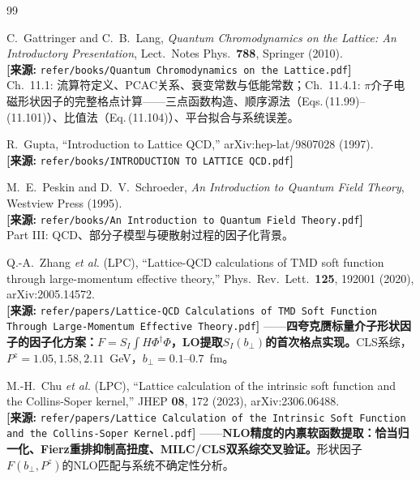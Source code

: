 \documentclass[12pt,a4paper]{ctexart}
\theoremstyle{definition}
\begin{document}
\begin{thebibliography}{99}

C.~Gattringer and C.~B.~Lang,
\textit{Quantum Chromodynamics on the Lattice: An Introductory Presentation},
Lect.\ Notes Phys.\ \textbf{788}, Springer (2010).
\\\textbf{[来源:} \texttt{refer/books/Quantum Chromodynamics on the Lattice.pdf}\textbf{]}
\\Ch.~11.1: 流算符定义、PCAC关系、衰变常数与低能常数；Ch.~11.4.1: $\pi$介子电磁形状因子的完整格点计算——三点函数构造、顺序源法（Eqs.\,(11.99)--(11.101)）、比值法（Eq.\,(11.104)）、平台拟合与系统误差。

R.~Gupta,
``Introduction to Lattice QCD,''
arXiv:hep-lat/9807028 (1997).
\\\textbf{[来源:} \texttt{refer/books/INTRODUCTION TO LATTICE QCD.pdf}\textbf{]}

M.~E.~Peskin and D.~V.~Schroeder,
\textit{An Introduction to Quantum Field Theory},
Westview Press (1995).
\\\textbf{[来源:} \texttt{refer/books/An Introduction to Quantum Field Theory.pdf}\textbf{]}
\\Part III: QCD、部分子模型与硬散射过程的因子化背景。

Q.-A.~Zhang \textit{et al.} (LPC),
``Lattice-QCD calculations of TMD soft function through large-momentum effective theory,''
Phys.\ Rev.\ Lett.\ \textbf{125}, 192001 (2020), arXiv:2005.14572.
\\\textbf{[来源:} \texttt{refer/papers/Lattice-QCD Calculations of TMD Soft Function Through Large-Momentum Effective Theory.pdf}\textbf{]}
——\textbf{四夸克赝标量介子形状因子的因子化方案：$F = S_I \int H \Phi^\dagger \Phi$，LO提取$S_I(b_\perp)$的首次格点实现。}CLS系综，$P^z = 1.05, 1.58, 2.11$~GeV，$b_\perp = 0.1\text{--}0.7$~fm。

M.-H.~Chu \textit{et al.} (LPC),
``Lattice calculation of the intrinsic soft function and the Collins-Soper kernel,''
JHEP \textbf{08}, 172 (2023), arXiv:2306.06488.
\\\textbf{[来源:} \texttt{refer/papers/Lattice Calculation of the Intrinsic Soft Function and the Collins-Soper Kernel.pdf}\textbf{]}
——\textbf{NLO精度的内禀软函数提取：恰当归一化、Fierz重排抑制高扭度、MILC/CLS双系综交叉验证。}形状因子$F(b_\perp, P^z)$的NLO匹配与系统不确定性分析。


\end{thebibliography}
\end{document}
